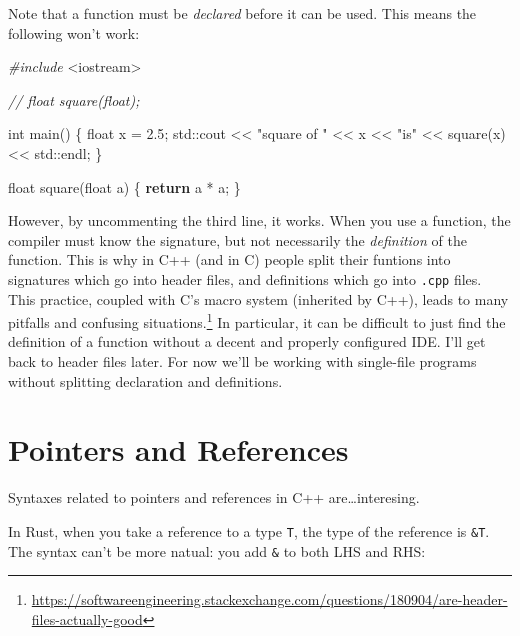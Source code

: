 \documentclass[
]{book}
\newenvironment{Shaded}{\begin{snugshade}}{\end{snugshade}}
\newcommand{\BuiltInTok}[1]{#1}
\newcommand{\CommentTok}[1]{\textcolor[rgb]{0.56,0.35,0.01}{\textit{#1}}}
\newcommand{\ControlFlowTok}[1]{\textcolor[rgb]{0.13,0.29,0.53}{\textbf{#1}}}
\newcommand{\DataTypeTok}[1]{\textcolor[rgb]{0.13,0.29,0.53}{#1}}
\newcommand{\FloatTok}[1]{\textcolor[rgb]{0.00,0.00,0.81}{#1}}
\newcommand{\ImportTok}[1]{#1}
\newcommand{\NormalTok}[1]{#1}
\newcommand{\PreprocessorTok}[1]{\textcolor[rgb]{0.56,0.35,0.01}{\textit{#1}}}
\newcommand{\StringTok}[1]{\textcolor[rgb]{0.31,0.60,0.02}{#1}}
\begin{document}
Note that a function must be \emph{declared} before it can be used. This means the following won't work:

\begin{Shaded}
\begin{Highlighting}[]
\PreprocessorTok{\#include }\ImportTok{\textless{}iostream\textgreater{}}

\CommentTok{// float square(float);}

\DataTypeTok{int}\NormalTok{ main()}
\NormalTok{\{}
    \DataTypeTok{float}\NormalTok{ x = }\FloatTok{2.5}\NormalTok{;}
    \BuiltInTok{std::}\NormalTok{cout \textless{}\textless{} }\StringTok{"square of "}\NormalTok{ \textless{}\textless{} x \textless{}\textless{} }\StringTok{"is"}\NormalTok{ \textless{}\textless{} square(x) \textless{}\textless{} }\BuiltInTok{std::}\NormalTok{endl;}
\NormalTok{\}}


\DataTypeTok{float}\NormalTok{ square(}\DataTypeTok{float}\NormalTok{ a)}
\NormalTok{\{}
    \ControlFlowTok{return}\NormalTok{ a * a;}
\NormalTok{\}}
\end{Highlighting}
\end{Shaded}

However, by uncommenting the third line, it works. When you use a function, the compiler must know the signature, but not necessarily the \emph{definition} of the function. This is why in C++ (and in C) people split their funtions into signatures which go into header files, and definitions which go into \texttt{.cpp} files. This practice, coupled with C's macro system (inherited by C++), leads to many pitfalls and confusing situations.\footnote{\url{https://softwareengineering.stackexchange.com/questions/180904/are-header-files-actually-good}} In particular, it can be difficult to just find the definition of a function without a decent and properly configured IDE. I'll get back to header files later. For now we'll be working with single-file programs without splitting declaration and definitions.

\hypertarget{pointers-and-references}{%
\section{Pointers and References}\label{pointers-and-references}}

Syntaxes related to pointers and references in C++ are\ldots interesing.

In Rust, when you take a reference to a type \texttt{T}, the type of the reference is \texttt{\&T}. The syntax can't be more natual: you add \texttt{\&} to both LHS and RHS:
\end{document}
